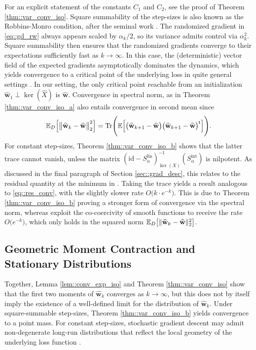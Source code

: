 \documentclass{article}
\newcommand*{\E}{\mathbb{E}} %
\newcommand*{\bfw}{\mathbf{w}}
\newcommand*{\inv}{^{-1}}
\newcommand*{\tran}{^{\mathsf{t}}}
\DeclarePairedDelimiter{\norm}{\lVert}{\rVert}
\newcommand*{\Tr}{\mathrm{Tr}}
\newcommand*{\id}{\mathrm{id}}
\newcommand{\whweight}{\widehat{\bfw}}
\newcommand{\whX}{\widehat{X}}
\newcommand{\Slin}{S^{\mathrm{lin}}}
\newcommand{\Sint}{S^{\mathrm{int}}}
\begin{document}
For an explicit statement of the constants $C_1$ and $C_2$, see the proof of
Theorem \ref{thm::var_conv_iso}. Square summability of the step-sizes is also
known as the Robbins-Monro condition, after the seminal work
\cite{robbins_monro_1951}. The randomized gradient in \eqref{eq::gd_rw} always
appears scaled by $\alpha_k / 2$, so its variance admits control via
$\alpha_k^2$. Square summability then ensures that the randomized gradients
converge to their expectations sufficiently fast as $k \to \infty$. In this
case, the (deterministic) vector field of the expected gradients asymptotically
dominates the dynamics, which yields convergence to a critical point of the
underlying loss in quite general settings \cite{davis_drusvyatskiy_et_al_2020,
dereich_kassing_2024}. In our setting, the only critical point reachable from an
initialization $\whweight_1 \perp \ker(\whX)$ is $\whweight$. Convergence in
spectral norm, as in Theorem \ref{thm::var_conv_iso_a} also entails convergence
in second mean since \begin{align*}
  \E_D\Big[\norm[\big]{\whweight_k - \whweight}_2^2\Big] =
  \Tr\Bigg(\E\Big[\big(\whweight_{k + 1} - \whweight\big) \big(\whweight_{k + 1}
  - \whweight\big)\tran\Big]\Bigg).
\end{align*} For constant step-sizes, Theorem \ref{thm::var_conv_iso_b} shows
that the latter trace cannot vanish, unless the matrix $(\id -
\Slin_\alpha)\inv_{\ker(X)} (\Sint_\alpha)$ is nilpotent. As discussed in the
final paragraph of Section \ref{sec::grad_desc}, this relates to the residual
quantity at the minimum in \cite{needell_srebro_et_al_2014}. Taking the trace
yields a result analogous to \eqref{eq::res_conv}, with the slightly slower rate
$O\big(k \cdot e^{- k}\big)$. This is due to Theorem \ref{thm::var_conv_iso_b}
proving a stronger form of convergence via the spectral norm, whereas
\cite{needell_srebro_et_al_2014} exploit the co-coercivity of smooth functions
to receive the rate $O\big(e^{- k}\big)$, which only holds in the squared norm
$\E_D\big[\norm{\whweight_k - \whweight}_2^2\big]$.

\subsection{Geometric Moment Contraction and Stationary Distributions}

Together, Lemma \ref{lem::conv_exp_iso} and Theorem \ref{thm::var_conv_iso} show
that the first two moments of $\whweight_k$ converges as $k \to \infty$, but
this does not by itself imply the existence of a well-defined limit for the
distribution of $\whweight_k$. Under square-summable step-sizes, Theorem
\ref{thm::var_conv_iso_b} yields convergence to a point mass. For constant
step-sizes, stochastic gradient descent may admit non-degenerate long-run
distributions that reflect the local geometry of the underlying loss function
\cite{azizian_iutzeler_et_al_2024}.
\end{document}
